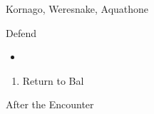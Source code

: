 \begin{paracol}{2}
\switchcolumn
\begin{encounter}{Kornago, Weresnake, Aquathone}
	\varwb
	\begin{notes}
		\item {}
	\end{notes}
	\begin{round}{1}
		\faris \leftCommand{\throw} \then \airBlade \space \then {}
        \galuf Defend
        \bartz \leftCommand{\gilToss}
        \lenna \leftCommand{\catch}
	\end{round}
    \begin{itemize}
        \item {}
    \end{itemize}
	\varwe
\end{encounter}

\begin{enumerate}[resume]
    \item Return to Bal
\end{enumerate}

\switchcolumn
\begin{steproute}{After the Encounter}
\end{steproute}

\end{paracol}